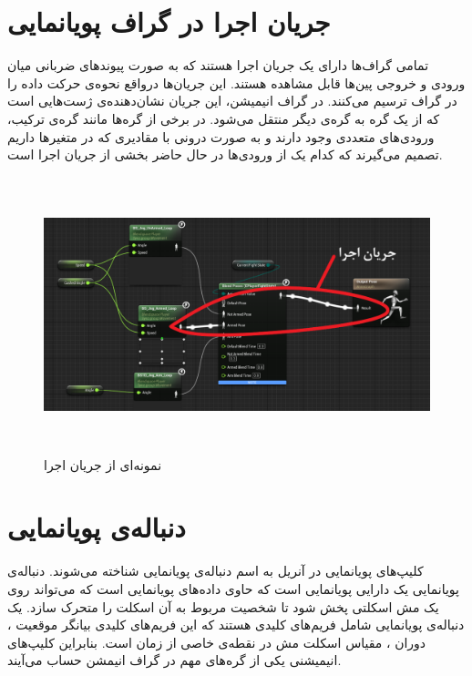 \section{جریان اجرا در گراف پویانمایی}

تمامی گراف‌ها دارای یک جریان اجرا هستند که به صورت پیوند‌های ضربانی 
میان ورودی و خروجی پین‌ها قابل مشاهده هستند. این جریان‌ها درواقع نحوه‌ی حرکت داده
را در گراف ترسیم می‌کنند.
در گراف انیمیشن، این جریان نشان‌دهنده‌ی ‌ژست‌هایی است که از 
یک گره به گره‌ی دیگر منتقل می‌شود.
در برخی از گره‌‌ها مانند گره‌ی ترکیب، ورودی‌های متعددی وجود دارند و به صورت 
درونی با مقادیری که در متغیر‌ها داریم تصمیم می‌گیرند که کدام یک از ورودی‌‌ها 
در حال حاضر بخشی از جریان اجرا است.


\begin{figure}[ht]
	\centerline{\includegraphics[width=\textwidth,height=8cm,keepaspectratio]{Figures/Ch3/ExecFlow.png}}

	\caption{نمونه‌ای از جریان اجرا}
	\label{fig:ExecFlow}
\end{figure}



\cite{AnimationGraphUnrealEngine}

\section {دنباله‌ی پویانمایی}

کلیپ‌های پویانمایی در آنریل به اسم دنباله‌ی پویانمایی شناخته می‌شوند.
دنباله‌ی پویانمایی یک دارایی پویانمایی است که 
حاوی داده‌‌های پویانمایی است که می‌تواند روی 
یک مش اسکلتی پخش شود تا شخصیت مربوط 
به آن اسکلت را متحرک سازد.
یک دنباله‌ی پویانمایی شامل فریم‌های کلیدی هستند که 
این فریم‌های کلیدی بیانگر موقعیت
، دوران 
، مقیاس
اسکلت مش در نقطه‌‌ی خاصی از زمان است.
بنابراین کلیپ‌های انیمیشنی یکی از گره‌های مهم در 
گراف انیمشن حساب می‌آیند.

